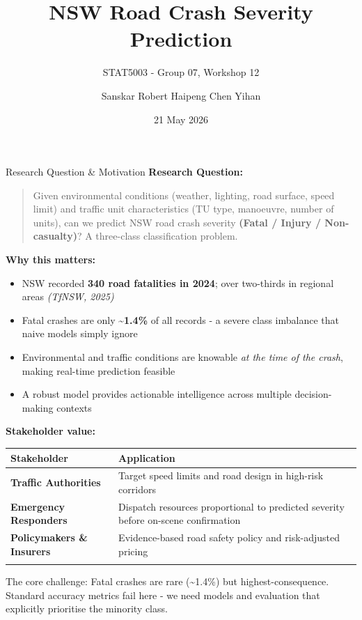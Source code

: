 \documentclass[
  ignorenonframetext,
]{beamer}
\title{NSW Road Crash Severity Prediction}
\subtitle{STAT5003 - Group 07, Workshop 12}
\author{Sanskar \textbar{} Robert \textbar{} Haipeng \textbar{} Chen
\textbar{} Yihan}
\date{21 May 2026}
\providecommand{\tightlist}{%
  \setlength{\itemsep}{0pt}\setlength{\parskip}{0pt}}
\begin{document}
\frame{\titlepage}

\begin{frame}
\end{frame}

\begin{frame}{Research Question \& Motivation}
\label{research-question-motivation}
\textbf{Research Question:}

\begin{quote}
Given environmental conditions (weather, lighting, road surface, speed
limit) and traffic unit characteristics (TU type, manoeuvre, number of
units), can we predict NSW road crash severity \textbf{(Fatal / Injury /
Non-casualty)}? A three-class classification problem.
\end{quote}

\textbf{Why this matters:}

\begin{itemize}
\tightlist
\item
  NSW recorded \textbf{340 road fatalities in 2024}; over two-thirds in
  regional areas \emph{(TfNSW, 2025)}
\item
  Fatal crashes are only \textbf{\textasciitilde1.4\%} of all records -
  a severe class imbalance that naive models simply ignore
\item
  Environmental and traffic conditions are knowable \emph{at the time of
  the crash}, making real-time prediction feasible
\item
  A robust model provides actionable intelligence across multiple
  decision-making contexts
\end{itemize}

\textbf{Stakeholder value:}

\begin{longtable}[]{@{}
  >{\raggedright\arraybackslash}p{}
  >{\raggedright\arraybackslash}p{}@{}}
\toprule\noalign{}
\begin{minipage}[b]{\linewidth}\raggedright
Stakeholder
\end{minipage} & \begin{minipage}[b]{\linewidth}\raggedright
Application
\end{minipage} \\
\midrule\noalign{}
\endhead
\textbf{Traffic Authorities} & Target speed limits and road design in
high-risk corridors \\
\textbf{Emergency Responders} & Dispatch resources proportional to
predicted severity before on-scene confirmation \\
\textbf{Policymakers \& Insurers} & Evidence-based road safety policy
and risk-adjusted pricing \\
\bottomrule\noalign{}
\end{longtable}

The core challenge: Fatal crashes are rare (\textasciitilde1.4\%) but
highest-consequence. Standard accuracy metrics fail here - we need
models and evaluation that explicitly prioritise the minority class.
\end{frame}
\end{document}
